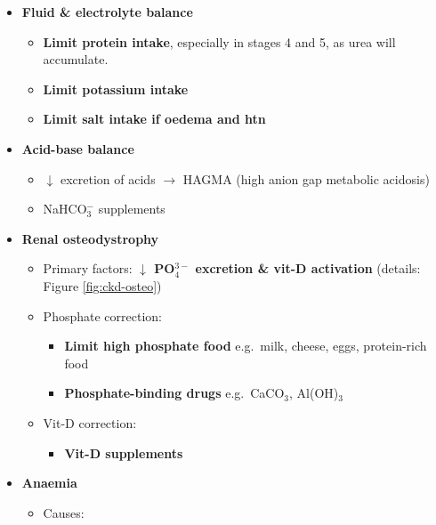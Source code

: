 \documentclass[
  12pt,
]{memoir}
\providecommand{\tightlist}{%
  \setlength{\itemsep}{0pt}\setlength{\parskip}{0pt}}
\begin{document}
\begin{itemize}
\tightlist
\item
  \textbf{Fluid \& electrolyte balance}

  \begin{itemize}
  \tightlist
  \item
    \textbf{Limit protein intake}, especially in stages 4 and 5, as urea
    will accumulate.
  \item
    \textbf{Limit potassium intake}
  \item
    \textbf{Limit salt intake if oedema and htn}
  \end{itemize}
\item
  \textbf{Acid-base balance}

  \begin{itemize}
  \tightlist
  \item
    \(\downarrow\) excretion of acids \(\rightarrow\) HAGMA (high anion
    gap metabolic acidosis)
  \item
    NaHCO\(_3^-\) supplements
  \end{itemize}
\item
  \textbf{Renal osteodystrophy}

  \begin{itemize}
  \tightlist
  \item
    Primary factors: \textbf{\(\downarrow\) PO\(_4^{3-}\) excretion \&
    vit-D activation} (details: Figure \ref{fig:ckd-osteo})
  \item
    Phosphate correction:

    \begin{itemize}
    \tightlist
    \item
      \textbf{Limit high phosphate food} e.g.~milk, cheese, eggs,
      protein-rich food
    \item
      \textbf{Phosphate-binding drugs} e.g.~CaCO\(_3\), Al(OH)\(_3\)
    \end{itemize}
  \item
    Vit-D correction:

    \begin{itemize}
    \tightlist
    \item
      \textbf{Vit-D supplements}
    \end{itemize}
  \end{itemize}
\item
  \textbf{Anaemia}

  \begin{itemize}
  \tightlist
  \item
    Causes:


\end{itemize}
\end{itemize}
\end{document}
